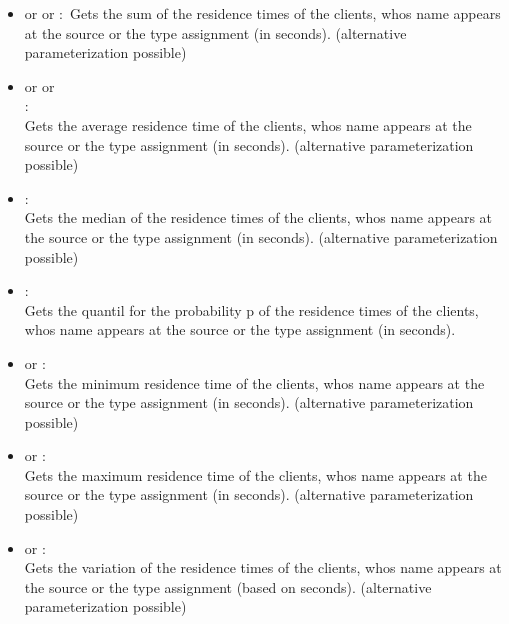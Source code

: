 \begin{itemize}

\item
{} or  or :\
Gets the sum of the residence times of the clients, whos name appears at the source or the type assignment  (in seconds).
(alternative parameterization possible)

\item
{} or  or\\ :\\
Gets the average residence time of the clients, whos name appears at the source or the type assignment  (in seconds).
(alternative parameterization possible)

\item
{}:\\
Gets the median of the residence times of the clients, whos name appears at the source or the type assignment  (in seconds).
(alternative parameterization possible)

\item
{}:\\
Gets the quantil for the probability p of the residence times of the clients, whos name appears at the source or the type assignment  (in seconds).

\item
{} or :\\
Gets the minimum residence time of the clients, whos name appears at the source or the type assignment  (in seconds).
(alternative parameterization possible)

\item
{} or :\\
Gets the maximum residence time of the clients, whos name appears at the source or the type assignment  (in seconds).
(alternative parameterization possible)

\item
{} or :\\
Gets the variation of the residence times of the clients, whos name appears at the source or the type assignment  (based on seconds).
(alternative parameterization possible)


\end{itemize}
